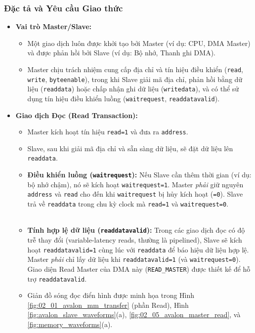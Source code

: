 \subsubsection{Đặc tả và Yêu cầu Giao thức}
\begin{itemize}
    \item \textbf{Vai trò Master/Slave:} 
    \begin{itemize}
        \item Một giao dịch luôn được khởi tạo bởi Master (ví dụ: CPU, DMA Master) và được phản hồi bởi Slave (ví dụ: Bộ nhớ, Thanh ghi DMA).
        \item Master chịu trách nhiệm cung cấp địa chỉ và tín hiệu điều khiển (\texttt{read}, \texttt{write}, \texttt{byteenable}), trong khi Slave giải mã địa chỉ, phản hồi bằng dữ liệu (\texttt{readdata}) hoặc chấp nhận ghi dữ liệu (\texttt{writedata}), và có thể sử dụng tín hiệu điều khiển luồng (\texttt{waitrequest}, \texttt{readdatavalid}).
    \end{itemize} 
    \item \textbf{Giao dịch Đọc (Read Transaction):}
        \begin{itemize}
            \item Master kích hoạt tín hiệu \texttt{read=1} và đưa ra \texttt{address}.
            \item Slave, sau khi giải mã địa chỉ và sẵn sàng dữ liệu, sẽ đặt dữ liệu lên \texttt{readdata}.
            \item \textbf{Điều khiển luồng (\texttt{waitrequest}):} Nếu Slave cần thêm thời gian (ví dụ: bộ nhớ chậm), nó sẽ kích hoạt \texttt{waitrequest=1}. Master \textit{phải} giữ nguyên \texttt{address} và \texttt{read} cho đến khi \texttt{waitrequest} bị hủy kích hoạt (\texttt{=0}). Slave trả về \texttt{readdata} trong chu kỳ clock mà \texttt{read=1} và \texttt{waitrequest=0}.
            \item \textbf{Tính hợp lệ dữ liệu (\texttt{readdatavalid}):} Trong các giao dịch đọc có độ trễ thay đổi (variable-latency reads, thường là pipelined), Slave sẽ kích hoạt \texttt{readdatavalid=1} cùng lúc với \texttt{readdata} để báo hiệu dữ liệu hợp lệ. Master \textit{phải} chỉ lấy dữ liệu khi \texttt{readdatavalid=1} (và \texttt{waitrequest=0}). Giao diện Read Master của DMA này (\texttt{READ\_MASTER}) được thiết kế để hỗ trợ \texttt{readdatavalid}.
            \item Giản đồ sóng đọc điển hình được minh họa trong Hình \ref{fig:02_01_avalon_mm_transfer} (phần Read), Hình \ref{fig:avalon_slave_waveforms}(a), \ref{fig:02_05_avalon_master_read}, và \ref{fig:memory_waveforms}(a).

\end{itemize}
\end{itemize}
